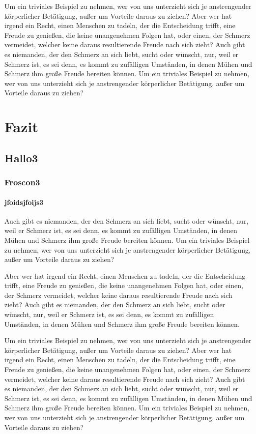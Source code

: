 \documentclass[12pt]{scrreprt}
\begin{document}
Um ein triviales Beispiel zu nehmen, wer von uns unterzieht sich je anstrengender körperlicher Betätigung, außer um Vorteile daraus zu ziehen? Aber wer hat irgend ein Recht, einen Menschen zu tadeln, der die Entscheidung trifft, eine Freude zu genießen, die keine unangenehmen Folgen hat, oder einen, der Schmerz vermeidet, welcher keine daraus resultierende Freude nach sich zieht? Auch gibt es niemanden, der den Schmerz an sich liebt, sucht oder wünscht, nur, weil er Schmerz ist, es sei denn, es kommt zu zufälligen Umständen, in denen Mühen und Schmerz ihm große Freude bereiten können. Um ein triviales Beispiel zu nehmen, wer von uns unterzieht sich je anstrengender körperlicher Betätigung, außer um Vorteile daraus zu ziehen?

\chapter{Fazit}

\section{Hallo3}

\subsection{Froscon3}

\subsubsection{jfoidsjfoijs3}

Auch gibt es niemanden, der den Schmerz an sich liebt, sucht oder wünscht, nur, weil er Schmerz ist, es sei denn, es kommt zu zufälligen Umständen, in denen Mühen und Schmerz ihm große Freude bereiten können. Um ein triviales Beispiel zu nehmen, wer von uns unterzieht sich je anstrengender körperlicher Betätigung, außer um Vorteile daraus zu ziehen?

Aber wer hat irgend ein Recht, einen Menschen zu tadeln, der die Entscheidung trifft, eine Freude zu genießen, die keine unangenehmen Folgen hat, oder einen, der Schmerz vermeidet, welcher keine daraus resultierende Freude nach sich zieht? Auch gibt es niemanden, der den Schmerz an sich liebt, sucht oder wünscht, nur, weil er Schmerz ist, es sei denn, es kommt zu zufälligen Umständen, in denen Mühen und Schmerz ihm große Freude bereiten können.

Um ein triviales Beispiel zu nehmen, wer von uns unterzieht sich je anstrengender körperlicher Betätigung, außer um Vorteile daraus zu ziehen? Aber wer hat irgend ein Recht, einen Menschen zu tadeln, der die Entscheidung trifft, eine Freude zu genießen, die keine unangenehmen Folgen hat, oder einen, der Schmerz vermeidet, welcher keine daraus resultierende Freude nach sich zieht? Auch gibt es niemanden, der den Schmerz an sich liebt, sucht oder wünscht, nur, weil er Schmerz ist, es sei denn, es kommt zu zufälligen Umständen, in denen Mühen und Schmerz ihm große Freude bereiten können. Um ein triviales Beispiel zu nehmen, wer von uns unterzieht sich je anstrengender körperlicher Betätigung, außer um Vorteile daraus zu ziehen?
\end{document}
